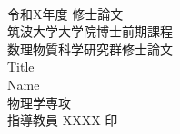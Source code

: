 ~
\begin{center}
	\vspace{10mm}
	{\large 令和X年度 修士論文}\\
	\vspace{10mm}
	{\Large 筑波大学大学院博士前期課程}\\
	\vspace{5mm}
	{\Large 数理物質科学研究群修士論文}\\
	\vspace{30mm}
	{\huge Title}\\
	\vspace{100mm}
	{\Large Name}\\
	\vspace{5mm}
	{\Large 物理学専攻}\\
	\vspace{10mm}
	{\Large 指導教員 XXXX 印}\\
	
\end{center}